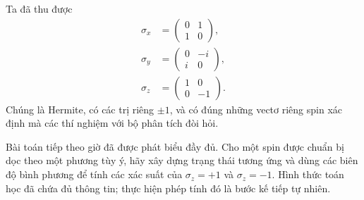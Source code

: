 \begin{classroomqa}
\end{classroomqa}

Ta đã thu được
\begin{equation}
\begin{aligned}
\sigma_x&=\begin{pmatrix}0&1\\1&0\end{pmatrix},\\[0.4em]
\sigma_y&=\begin{pmatrix}0&-i\\i&0\end{pmatrix},\\[0.4em]
\sigma_z&=\begin{pmatrix}1&0\\0&-1\end{pmatrix}.
\end{aligned}
\label{eq:pauli-triple}
\end{equation}
Chúng là Hermite, có các trị riêng \(\pm1\), và có đúng những vectơ riêng spin xác định mà các thí nghiệm với bộ phân tích đòi hỏi.

Bài toán tiếp theo giờ đã được phát biểu đầy đủ. Cho một spin được chuẩn bị dọc theo một phương tùy ý, hãy xây dựng trạng thái tương ứng và dùng các biên độ bình phương để tính các xác suất của \(\sigma_z=+1\) và \(\sigma_z=-1\). Hình thức toán học đã chứa đủ thông tin; thực hiện phép tính đó là bước kế tiếp tự nhiên.
